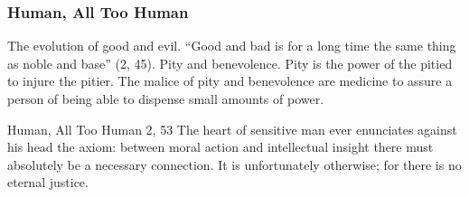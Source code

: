 \documentclass[xcolor=dvipsnames]{beamer}
\begin{document}
\begin{frame}
  \frametitle{Human, All Too Human}
  The evolution of good and evil. ``Good and bad is for a long time
  the same thing as noble and base'' (2, 45). Pity and benevolence.
  Pity is the power of the pitied to injure the pitier. The malice of
  pity and benevolence are medicine to assure a person of being able
  to dispense small amounts of power.
  \begin{block}{Human, All Too Human 2, 53}
    The heart of sensitive man ever enunciates against his head the
    axiom: between moral action and intellectual insight there must
    absolutely be a necessary connection. It is unfortunately
    otherwise; for there is no eternal justice.
  \end{block}
\end{frame}


\end{document}
